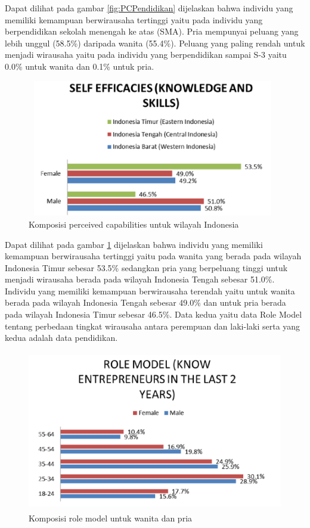 Dapat dilihat pada gambar \ref{fig:PCPendidikan} dijelaskan bahwa individu yang memiliki kemampuan berwirausaha tertinggi yaitu pada individu yang berpendidikan sekolah menengah ke atas (SMA). Pria mempunyai peluang yang lebih unggul (58.5\%) daripada wanita (55.4\%). Peluang yang paling rendah untuk menjadi wirausaha yaitu pada individu yang berpendidikan sampai S-3 yaitu 0.0\% untuk wanita dan 0.1\% untuk pria. 

\begin{figure} [H]
	\centering  
	\includegraphics[width=11cm, height=6cm]{PCRegion} 
	\caption[Komposisi perceived capabilities untuk wilayah Indonesia]{Komposisi perceived capabilities untuk wilayah Indonesia} 
	\label{fig:PCRegion} 
\end{figure}

Dapat dilihat pada gambar \ref{fig:PCRegion} dijelaskan bahwa individu yang memiliki kemampuan berwirausaha tertinggi yaitu pada wanita yang berada pada wilayah Indonesia Timur sebesar 53.5\% sedangkan pria yang berpeluang tinggi untuk menjadi wirausaha berada pada wilayah Indonesia Tengah sebesar 51.0\%. Individu yang memiliki kemampuan berwirausaha terendah yaitu untuk wanita berada pada wilayah Indonesia Tengah sebesar 49.0\% dan untuk pria berada pada wilayah Indonesia Timur sebesar 46.5\%. Data kedua yaitu data Role Model tentang perbedaan tingkat wirausaha antara perempuan dan laki-laki serta yang kedua adalah data pendidikan.

\begin{figure} [H]
	\centering  
	\includegraphics[width=12cm, height=7cm]{RMfemalemale} 
	\caption[Komposisi role model untuk wanita dan pria]{Komposisi role model untuk wanita dan pria} 
	\label{fig:RMfemalemale} 
\end{figure}


